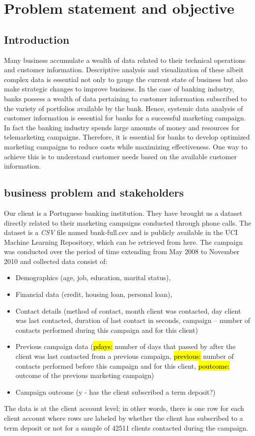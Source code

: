 \chapter{Problem statement and objective}

\section{Introduction}
Many business accumulate a wealth of data related to their technical operations and customer information. Descriptive analysis and visualization of these albeit complex data is essential not only to gauge the current state of business but also make strategic changes to improve business. In the case of banking industry, banks possess a wealth of data pertaining to customer information subscribed to the variety of portfolios available by the bank. Hence, systemic data analysis of customer information is essential for banks for a successful marketing campaign. In fact the banking industry spends large amounts of money and resources for telemarketing campaigns. Therefore, it is essential for banks to develop optimized marketing campaigns to reduce costs while maximizing effectiveness. One way to achieve this is to understand customer needs based on the available customer information. 

\section{business problem and stakeholders}
Our client is a Portuguese banking institution. They have brought us a dataset directly related to their marketing campaigns conducted through phone calls. The dataset is a \textit{CSV} file named {\color{red} bank-full.csv} and is publicly available in the {\color{red}UCI Machine Learning Repository}, which can be retrieved from here.  The campaign was conducted over the period of time extending from May 2008 to November 2010 and collected data consist of: 
\begin{itemize}
\item Demographics (age, job, education, marital status), 
\item Financial data (credit, housing loan, personal loan), 
\item Contact details (method of contact, month client was contacted, day client was last contacted, duration of last contact in seconds, campaign -- number of contacts performed during this campaign and for this client)
\item Previous campaign data (\hl{pdays:} number of days that passed by after the client was last contacted from a previous campaign, \hl{previous:} number of contacts performed before this campaign and for this client, \hl{poutcome:} outcome of the previous marketing campaign)
\item Campaign outcome (y - has the client subscribed a term deposit?)
\end{itemize}
The data is at the client account level; in other words, there is one row for each client account where rows are labeled by whether the client has subscribed to a term deposit or not for a sample of 42511 clients contacted during the campaign. 

